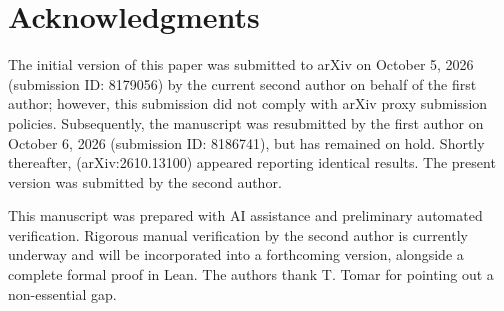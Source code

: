 \documentclass[11pt]{amsart}
\theoremstyle{definition}
\theoremstyle{remark}
\begin{document}
\section*{Acknowledgments}
The initial version of this paper was submitted to arXiv on October 5, 2026 (submission ID: 8179056) by the current second author on behalf of the first author; however, this submission did not comply with arXiv proxy submission policies. Subsequently, the manuscript was resubmitted by the first author on October 6, 2026 (submission ID: 8186741), but has remained on hold. Shortly thereafter, \cite{FiveT} (arXiv:2610.13100) appeared reporting identical results. The present version was submitted by the second author.

This manuscript was prepared with AI assistance and preliminary automated verification. Rigorous manual verification by the second author is currently underway and will be incorporated into a forthcoming version, alongside a complete formal proof in Lean. The authors thank T. Tomar for pointing out a non-essential gap.
\end{document}
